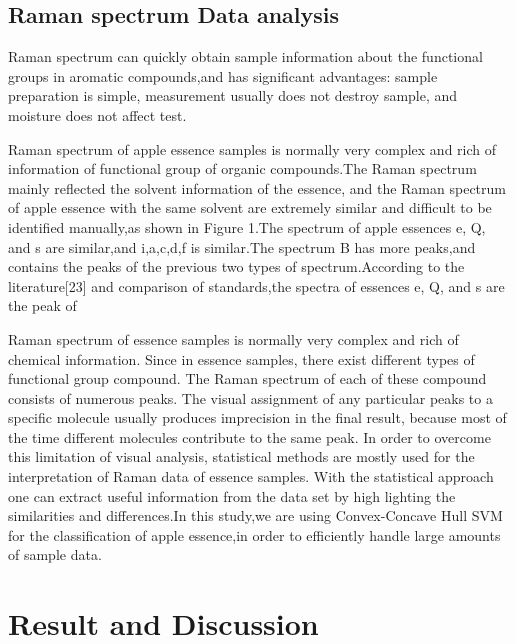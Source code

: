 \documentclass[a4paper]{article}
\begin{document}
\subsection{Raman spectrum Data analysis}
Raman spectrum can quickly obtain sample information about the functional groups in aromatic compounds,and has significant advantages: sample preparation is simple, measurement usually does not destroy sample, and moisture does not affect test.

Raman spectrum of apple essence samples is normally very complex and rich of information of functional group of organic compounds.The Raman spectrum mainly reflected the solvent information of the essence, and the Raman spectrum of apple essence with the same solvent are extremely similar and difficult to be identified manually,as shown in Figure 1.The spectrum of apple essences e, Q, and s are similar,and i,a,c,d,f is similar.The spectrum B has more peaks,and contains the peaks of the previous two types of spectrum.According to the literature[23] and comparison of standards,the spectra of essences e, Q, and s are the peak of

Raman  spectrum  of  essence samples  is  normally  very  complex  and  rich  of  chemical information.  Since  in essence  samples,  there  exist  different  types  of  functional group compound. The Raman spectrum of each of these compound consists of  numerous peaks.  The  visual  assignment  of  any  particular  peaks  to  a  specific  molecule usually  produces  imprecision  in  the  final  result,  because  most  of  the  time  different molecules  contribute  to  the  same  peak.  In  order  to  overcome  this  limitation  of  visual analysis, statistical methods are mostly used for the interpretation of Raman data of essence samples. With the statistical approach one can extract useful information from the data set by high  lighting  the  similarities  and differences.In  this  study,we  are using Convex-Concave Hull SVM  for  the  classification of  apple essence,in order to efficiently handle large amounts of sample data.
\section{Result and Discussion}
\end{document}
